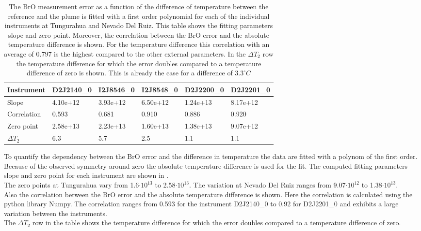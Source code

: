 \begin{table}[h]
	\begin{tabular}{|p{2cm}|p{2cm}|p{2cm}|p{2cm}|p{2cm}|p{2cm}|}
		Instrument	&D2J2140\_0&I2J8546\_0& I2J8548\_0&D2J2200\_0&D2J2201\_0\\
		\toprule
		Slope&4.10e+12 &3.93e+12 &6.50e+12 &1.24e+13&8.17e+12 \\
		\midrule
		Correlation
		& 
		0.593& 
		0.681& 
		0.910& 
		0.886& 
		0.920\\
		\midrule
		Zero point&2.58e+13&2.23e+13&1.60e+13& 1.38e+13& 9.07e+12\\
		\midrule
		$\Delta T_{2}$&6.3&5.7&2.5&1.1&1.1\\
		\bottomrule
	\end{tabular}
	\label{tab:tempe}
	\caption{The BrO measurement error as a function of the difference of temperature between the reference and the plume is fitted with a first order polynomial for each of the individual instruments at Tungurahua and Nevado Del Ruiz. This table shows the fitting parameters slope and zero point. Moreover, the correlation between the BrO error and the absolute temperature difference is shown. For the temperature difference this correlation with an average of $0.797$ is the highest compared to the other external parameters. In the $\Delta T_{2}$ row the temperature difference for which the error doubles compared to a temperature difference of zero is shown. This is already the case for a difference of $3.3^\circ C$}
\end{table}
To quantify the dependency between the BrO error and the difference in temperature the data are fitted with a polynom of the first order. Because of the observed symmetry around zero the absolute temperature difference is used for the fit. The computed fitting parameters slope and zero point for each instrument are shown in . \\
The zero points at Tungurahua vary from 1.6$\cdot10^{13}$ to 2.58$\cdot10^{13}$. The variation at Nevado Del Ruiz ranges from  9.07$\cdot10^{12}$ to 1.38$\cdot10^{13}$.\\
Also the correlation between the BrO error and the absolute temperature difference is shown. Here the correlation is calculated using the python library Numpy. The correlation ranges from 0.593 for the instrument D2J2140\_0 to  0.92 for D2J2201\_0 and exhibits a large variation between the instruments.\\
The $\Delta T_{2}$ row in the table shows the temperature difference for which the error doubles compared to a temperature difference of zero.
